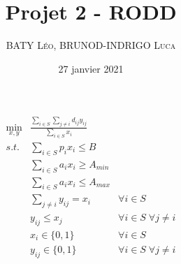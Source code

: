 \documentclass[12pt]{extarticle}
\title{Projet 2 -  RODD}
\date{27 janvier 2021}
\author{\textsc{BATY Léo}, \textsc{BRUNOD-INDRIGO Luca}}
\begin{document}
\maketitle

\begin{align*}
    \min_{x, y} &\frac{\sum_{i \in S} \sum_{j \neq i} d_{ij} y_{ij}}{\sum_{i \in S} x_i} &\\
    s.t.   & \sum_{i \in S} p_i x_i \leq B\\
           & \sum_{i \in S} a_i x_i \geq A_{min}\\
           & \sum_{i \in S} a_i x_i \leq A_{max}\\
           & \sum_{j \neq i} y_{ij} = x_i   & \forall i \in S\\
           & y_{ij} \leq x_j                & \forall i \in S \; \forall j \neq i\\
           & x_i \in \{0, 1\}   & \forall i \in S\\
           & y_{ij} \in \{0, 1\}   & \forall i \in S \; \forall j \neq i
\end{align*}
\end{document}
